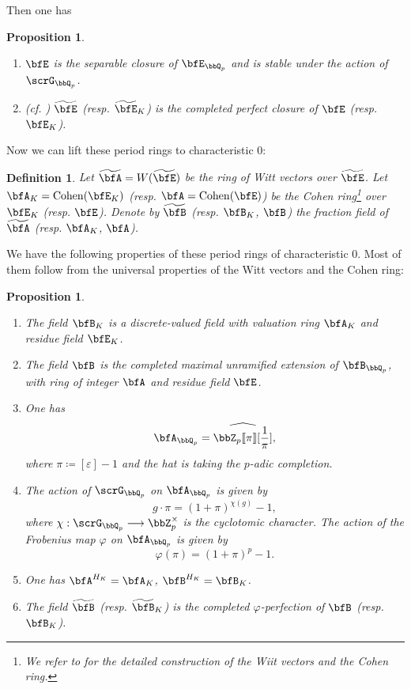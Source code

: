 \documentclass[a4paper,oneside]{amsart}
\newtheorem{proposition}[theorem]{Proposition}
\newtheorem{definition}[theorem]{Definition}
\numberwithin{equation}{section}
\numberwithin{figure}{section}
\begin{document}
Then one has
\begin{proposition}\leavevmode
    \begin{enumerate}
        \item $\bfE$ is the separable closure of $\bfE_{\bbQ_p}$ and is stable under the action of $\scrG_{\bbQ_p}$.
        \item (cf. \cite[Corollaire 4.3.4]{wintenberger_corps_1983}) $\widetilde{\bfE}$ (resp. $\widetilde{\bfE}_K$) is the completed perfect closure of $\bfE$ (resp. $\bfE_K$).
    \end{enumerate}
\end{proposition}

Now we can lift these period rings to characteristic $0$:
\begin{definition}
    Let $\widetilde{\bfA}=W(\widetilde{\bfE})$ be the ring of Witt vectors over $\widetilde{\bfE}$. Let $\bfA_K=\opn{Cohen}(\bfE_K)$ (resp. $\bfA=\opn{Cohen}(\bfE)$) be the Cohen ring\footnote{We refer to \cite[Chapitre IX]{bourbaki_algebre_2006} for the detailed construction of the Wiit vectors and the Cohen ring.} over $\bfE_K$ (resp. $\bfE$). Denote by $\widetilde{\bfB}$ (resp. $\bfB_K$, $\bfB$) the fraction field of $\widetilde{\bfA}$ (resp. $\bfA_K$, $\bfA$).
\end{definition}

We have the following properties of these period rings of characteristic $0$. Most of them follow from the universal properties of the Witt vectors and the Cohen ring:
\begin{proposition}\leavevmode
    \begin{enumerate}
        \item The field $\bfB_K$ is a discrete-valued field with valuation ring $\bfA_K$ and residue field $\bfE_K$.
        \item The field $\bfB$ is the completed maximal unramified extension of $\bfB_{\bbQ_p}$, with ring of integer $\bfA$ and residue field $\bfE$.
        \item One has
              $$\bfA_{\bbQ_p}=\widehat{\bbZ_p\llbracket\pi\rrbracket[\frac{1}{\pi}]},$$
              where $\pi\coloneqq [\varepsilon]-1$ and the hat is taking the $p$-adic completion.
        \item The action of $\scrG_{\bbQ_p}$ on $\bfA_{\bbQ_p}$ is given by
              $$g\cdot\pi=(1+\pi)^{\chi(g)}-1,$$ where $\chi:\scrG_{\bbQ_p}\lto \bbZ_p^\times$ is the cyclotomic character. The action of the Frobenius map $\varphi$ on $\bfA_{\bbQ_p}$ is given by
              $$\varphi(\pi)=(1+\pi)^p-1.$$
        \item One has $\bfA^{H_K}=\bfA_K$, $\bfB^{H_K}=\bfB_K$.
        \item The field $\widetilde{\bfB}$ (resp. $\widetilde{\bfB}_K$) is the completed $\varphi$-perfection of $\bfB$ (resp. $\bfB_K$).
    \end{enumerate}
\end{proposition}
\end{document}
